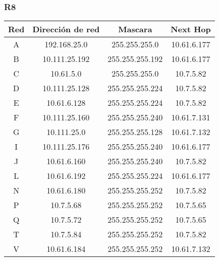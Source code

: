 \subsubsection{R8}
\begin{table}[!htbp]
\centering
  \begin{tabular}{|c|c|c|c|}
    \hline
	Red & Dirección de red & Mascara & Next Hop\\ \hline
	A & 192.168.25.0 & 255.255.255.0 & 10.61.6.177 \\ \hline
	B & 10.111.25.192 & 255.255.255.192 & 10.61.6.177 \\ \hline
	C & 10.61.5.0 & 255.255.255.0 & 10.7.5.82 \\ \hline
	D & 10.111.25.128 & 255.255.255.224 & 10.7.5.82 \\ \hline
	E & 10.61.6.128 & 255.255.255.224 & 10.7.5.82 \\ \hline
	F & 10.111.25.160 & 255.255.255.240 & 10.61.7.131 \\ \hline
	G & 10.111.25.0 & 255.255.255.128 & 10.61.7.132 \\ \hline
	I & 10.111.25.176 & 255.255.255.240 & 10.61.6.177 \\ \hline
	J & 10.61.6.160 & 255.255.255.240 & 10.7.5.82 \\ \hline
	L & 10.61.6.192 & 255.255.255.224 & 10.61.6.177 \\ \hline
	N & 10.61.6.180 & 255.255.255.252 & 10.7.5.82 \\ \hline
	P & 10.7.5.68 & 255.255.255.252 & 10.7.5.65 \\ \hline
	Q & 10.7.5.72 & 255.255.255.252 & 10.7.5.65 \\ \hline
	T & 10.7.5.84 & 255.255.255.252 & 10.7.5.82 \\ \hline
	V & 10.61.6.184 & 255.255.255.252 & 10.61.7.132 \\
    \hline
  \end{tabular}
\end{table}

\newpage

